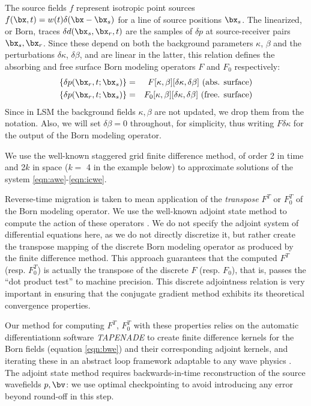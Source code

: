 The source fields $f$ represent isotropic point sources
$f(\bx,t)=w(t)\delta(\bx-\bx_s)$ for a line of source positions
$\bx_s$. The linearized, or Born, traces $\delta d(\bx_s,\bx_r,t)$ are
the samples of $\delta p$ at source-receiver pairs
$\bx_s,\bx_r$. Since these depend on both the background parameters
$\kappa$, $\beta$ and the perturbations $\delta \kappa$, $\delta
\beta$, and are linear in the latter, this relation defines the
absorbing and free surface Born modeling operators $F$ and $F_0$ respectively:
\begin{eqnarray}
\label{eqn:afdef}
\{\delta p(\bx_r,t;\bx_s)\} &=& F[\kappa,\beta][\delta \kappa, \delta \beta]\mbox{
  (abs. surface)}\\
\label{eqn:ffdef}
\{\delta p(\bx_r,t;\bx_s)\} &=& F_0[\kappa,\beta][\delta \kappa, \delta \beta]\mbox{ (free. surface)}
\end{eqnarray}
Since in LSM the background fields $\kappa, \beta$ are not updated, we
drop them from the notation. Also, we will set $\delta \beta = 0$
throughout, for simplicity, thus writing $F \delta \kappa$ for the
output of the Born modeling operator. 

 We use the well-known staggered grid
finite difference method, of order 2 in time and 2$k$ in space
($k=$ 4 in the example below) to approximate solutions of the system
\ref{eqn:awe}-\ref{eqn:icwe}.

Reverse-time migration is taken to mean application of the {\em
  transpose} $F^T$ or $F^T_0$ of the Born modeling operator. We use the
well-known adjoint state method to compute the action of these operators
\cite[]{Plessix:06}. We
do not specify the adjoint system of differential
equations  here, as
we do not directly discretize it, but rather create the transpose
mapping of the discrete Born modeling operator as produced by the
finite difference method. This approach guarantees that the computed
$F^T$ (resp. $F_0^T$) is actually the transpose of the discrete $F$
(resp. $F_0$), that is, passes the ``dot
product test'' to machine precision. This discrete adjointness
relation is very important in ensuring that the conjugate gradient
method exhibits its theoretical convergence properties. 

Our method for computing $F^T$, $F_0^T$ with these properties relies on the
automatic differentiationn software {\em TAPENADE}
\cite[]{TapenadeRef13} to create finite
difference kernels for the Born fields (equation \ref{eqn:bwe}) and
their corresponding adjoint kernels, and iterating these in an
abstract loop framework adaptable to any wave physics \cite[]{GeoPros:11}. The adjoint state method requires backwards-in-time
reconstruction of the source wavefields $p,\bv$: we use optimal
checkpointing \cite[]{Griewank:00,Symes:06a-pub} to avoid introducing any error
beyond round-off in this step.


